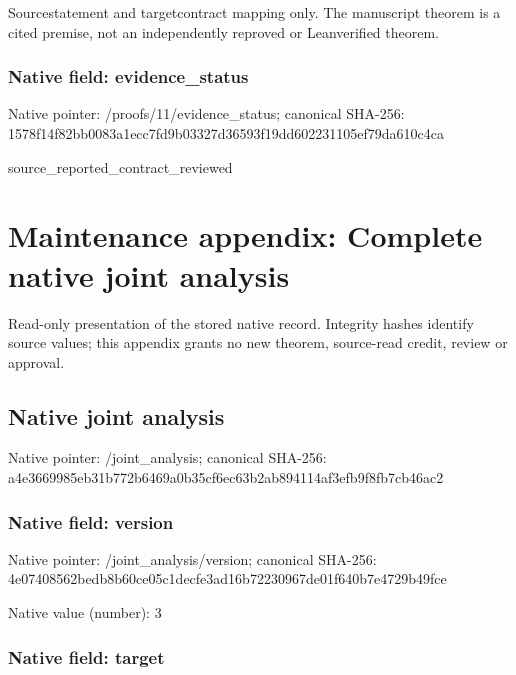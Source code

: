 \documentclass[10pt,a4paper]{article}
\begin{document}
Sourcestatement and targetcontract mapping only. The manuscript theorem is a cited premise, not an independently reproved or Leanverified theorem.


\subsubsection{Native field: evidence\_status}


Native pointer: /proofs/11/evidence\_status; canonical SHA-256: 1578f14f82bb0083a1ecc7fd\allowbreak{}9b03327d36593f19dd602231\allowbreak{}105ef79da610c4ca


source\_reported\_contract\_reviewed


\section{Maintenance appendix: Complete native joint analysis}


Read-only presentation of the stored native record. Integrity hashes identify source values; this appendix grants no new theorem, source-read credit, review or approval.



\subsection{Native joint analysis}


Native pointer: /joint\_analysis; canonical SHA-256: a4e3669985eb31b772b6469a\allowbreak{}0b35cf6ec63b2ab894114af3\allowbreak{}efb9f8fb7cb46ac2



\subsubsection{Native field: version}


Native pointer: /joint\_analysis/version; canonical SHA-256: 4e07408562bedb8b60ce05c1\allowbreak{}decfe3ad16b72230967de01f\allowbreak{}640b7e4729b49fce



Native value (number): 3



\subsubsection{Native field: target}
\end{document}
